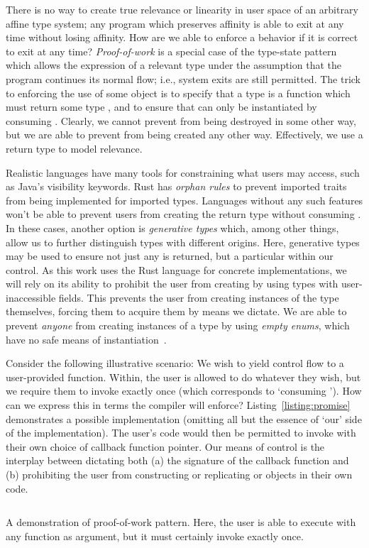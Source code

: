 There is no way to create true relevance or linearity in user space of an arbitrary affine type system; any program which preserves affinity is able to exit at any time without losing affinity. How are we able to enforce a behavior if it is correct to exit at any time? \textit{Proof-of-work} is a special case of the type-state pattern which allows the expression of a relevant type under the assumption that the program continues its normal flow; i.e., system exits are still permitted. The trick to enforcing the use of some object  is to specify that a type is a function which must return some type , and to ensure that  can only be instantiated by consuming . Clearly, we cannot prevent  from being destroyed in some other way, but we are able to prevent  from being created any other way. Effectively, we use a return type to model relevance.

Realistic languages have many tools for constraining what users may access, such as Java's visibility keywords. Rust has \textit{orphan rules} to prevent imported traits from being implemented for imported types. Languages without any such features won't be able to prevent users from creating the return type  without consuming . In these cases, another option is \textit{generative types} which, among other things, allow us to further distinguish types with different origins. Here, generative types may be used to ensure not just any  is returned, but a particular  within our control. As this work uses the Rust language for concrete implementations, we will rely on its ability to prohibit the user from creating  by using types with user-inaccessible fields. This prevents the user from creating instances of the type themselves, forcing them to acquire them by means we dictate. We are able to prevent \textit{anyone} from creating instances of a type by using \textit{empty enums}, which have no safe means of instantiation~\cite{exotic_sizes}.

Consider the following illustrative scenario: We wish to yield control flow to a user-provided function. Within, the user is allowed to do whatever they wish, but we require them to invoke   exactly once (which corresponds to `consuming '). How can we express this in terms the compiler will enforce? Listing~\ref{listing:promise} demonstrates a possible implementation (omitting all but the essence of `our' side of the implementation). The user's code would then be permitted to invoke  with their own choice of callback function pointer. Our means of control is the interplay between dictating both (a)
the signature of the callback function and (b) prohibiting the user from constructing or replicating  or  objects in their own code.

\begin{listing}[ht]
	\inputminted[]{rust}{promise.rs}
	\caption[Proof of work pattern example of `promises'.]{A demonstration of proof-of-work pattern. Here, the user is able to execute  with any function as argument, but it must certainly invoke  exactly once.}
	\label{listing:promise}
\end{listing}
